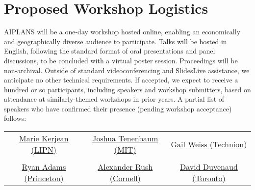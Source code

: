 \documentclass{article}
\begin{document}





    \section*{Proposed Workshop Logistics}

    AIPLANS will be a one-day workshop hosted online, enabling an economically and geographically diverse audience to participate. Talks will be hosted in English, following the standard format of oral presentations and panel discussions, to be concluded with a virtual poster session. Proceedings will be non-archival. Outside of standard videoconferencing and SlidesLive assistance, we anticipate no other technical requirements. If accepted, we expect to receive a hundred or so participants, including speakers and workshop submitters, based on attendance at similarly-themed workshops in prior years. A partial list of speakers who have confirmed their presence (pending workshop acceptance) follows:

    \begin{center}
        \begin{tabular}{ c c c }
            \href{https://www.irif.fr/~kerjean/}{Marie Kerjean (LIPN)} & \href{https://mitibmwatsonailab.mit.edu/people/joshua-tenenbaum/}{Joshua Tenenbaum (MIT)} & \href{https://sgailw.cswp.cs.technion.ac.il/}{Gail Weiss (Technion)} \\\\
            \href{https://www.cs.princeton.edu/~rpa/}{Ryan Adams (Princeton)} & \href{http://rush-nlp.com/}{Alexander Rush (Cornell)} & \href{http://www.cs.toronto.edu/~duvenaud/}{David Duvenaud (Toronto)}
        \end{tabular}
    \end{center}
\end{document}
